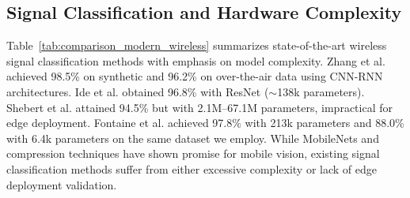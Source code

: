 \documentclass[conference]{IEEEtran}
\begin{document}
\subsection{Signal Classification and Hardware Complexity}

Table~\ref{tab:comparison_modern_wireless} summarizes state-of-the-art wireless signal classification methods with emphasis on model complexity. Zhang et al. \cite{zhang2021signal} achieved 98.5\% on synthetic and 96.2\% on over-the-air data using CNN-RNN architectures. Ide et al. \cite{ide2024evaluation} obtained 96.8\% with ResNet \cite{he2016deep} ($\sim$138k parameters). Shebert et al. \cite{shebert2021wireless} attained 94.5\% but with 2.1M--67.1M parameters, impractical for edge deployment. Fontaine et al. \cite{fontaine2019low} achieved 97.8\% with 213k parameters and 88.0\% with 6.4k parameters on the same dataset we employ. While MobileNets \cite{howard2017mobilenets} and compression techniques \cite{han2015deep} have shown promise for mobile vision, existing signal classification methods suffer from either excessive complexity or lack of edge deployment validation.
\end{document}
